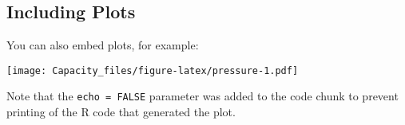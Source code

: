 \documentclass[]{article}
\begin{document}
\subsection{Including Plots}\label{including-plots}

You can also embed plots, for example:

\texttt{[image: Capacity\_files/figure-latex/pressure-1.pdf]}

Note that the \texttt{echo\ =\ FALSE} parameter was added to the code
chunk to prevent printing of the R code that generated the plot.
\end{document}
